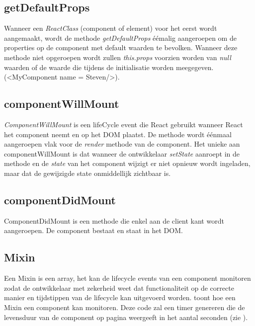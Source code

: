 	\subsection{getDefaultProps}
		
		Wanneer een \emph{ReactClass} (component of element) voor het eerst wordt aangemaakt, wordt de methode \emph{getDefaultProps} éémalig aangeroepen om de properties op de component met default waarden te bevolken. Wanneer deze methode niet opgeroepen wordt zullen \emph{this.props} voorzien worden van \emph{null} waarden of de waarde die tijdens de initialisatie worden meegegeven. (<MyComponent name = \textquotedbl Steven\textquotedbl />).
	
	\subsection{componentWillMount}
		
		\emph{ComponentWillMount} is een lifeCycle event die React gebruikt wanneer React het component neemt en op het DOM plaatst. De methode wordt éénmaal aangeroepen vlak voor de \emph{render} methode van de component. Het unieke aan componentWillMount is dat wanneer de ontwikkelaar \emph{setState} aanroept in de methode en de \emph{state} van het component wijzigt er niet opnieuw wordt ingeladen, maar dat de gewijzigde state onmiddellijk zichtbaar is.
	
	\subsection{componentDidMount}
		
		ComponentDidMount is een methode die enkel aan de client kant wordt aangeroepen. De component bestaat en staat in het DOM.
	
	\subsection{Mixin}
		
		Een Mixin is een array, het kan de lifecycle events van een component monitoren zodat de ontwikkelaar met zekerheid weet dat functionaliteit op de correcte manier en tijdstippen van de lifecycle kan uitgevoerd worden.  toont hoe een Mixin een component kan monitoren. Deze code zal een timer genereren die de levensduur van de component op pagina weergeeft in het aantal seconden (zie ).
		
		
